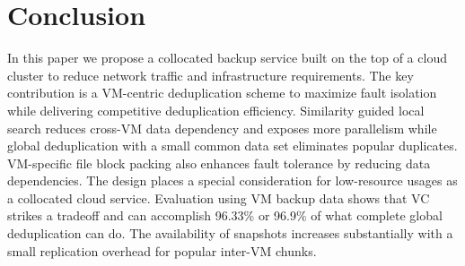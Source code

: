 \section{Conclusion}
\label{sect:conclusion}
In this paper we propose a collocated backup service built on
the top of a cloud cluster to reduce network traffic and infrastructure requirements.
The key contribution is a VM-centric deduplication scheme to 
maximize fault isolation while delivering competitive deduplication efficiency.
Similarity guided local search reduces cross-VM data dependency and exposes more parallelism  
while global deduplication with a small common data set eliminates popular duplicates.
VM-specific file block packing also enhances fault tolerance by reducing data dependencies.
The design places a special consideration for low-resource usages as a collocated cloud service.
Evaluation using  VM backup data shows that VC strikes a tradeoff and 
can accomplish 96.33\% or 96.9\% of what complete global
deduplication can do.  The availability of snapshots increases substantially with 
a small replication overhead for popular inter-VM chunks.

